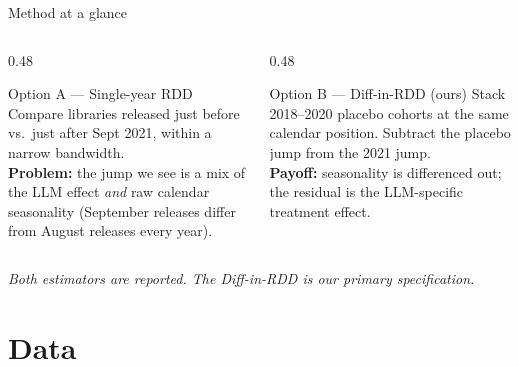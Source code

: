 \documentclass[10pt, aspectratio=169]{beamer}
\begin{document}
\begin{frame}{Method at a glance}
    \begin{columns}[T]
        \begin{column}{0.48\textwidth}
            \begin{block}{Option A --- Single-year RDD}
                Compare libraries released just before vs.\ just after Sept 2021, within a narrow bandwidth.
                \\[0.5em]
                \textbf{Problem:} the jump we see is a mix of the LLM effect \emph{and} raw calendar seasonality (September releases differ from August releases every year).
            \end{block}
        \end{column}
        \begin{column}{0.48\textwidth}
            \begin{exampleblock}{Option B --- Diff-in-RDD (ours)}
                Stack 2018--2020 placebo cohorts at the same calendar position. Subtract the placebo jump from the 2021 jump.
                \\[0.5em]
                \textbf{Payoff:} seasonality is differenced out; the residual is the LLM-specific treatment effect.
            \end{exampleblock}
        \end{column}
    \end{columns}
    \vfill
    \footnotesize \emph{Both estimators are reported. The Diff-in-RDD is our primary specification.}
\end{frame}

\section{Data}
\end{document}
